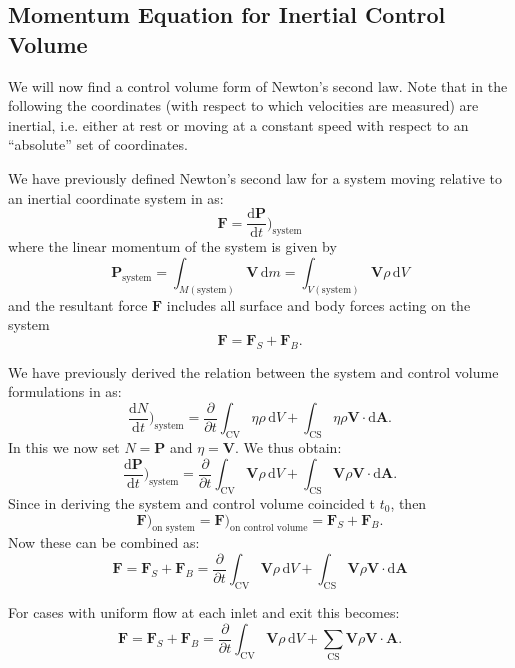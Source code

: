 
\subsection{Momentum Equation for Inertial Control Volume}
We will now find a control volume form of Newton's second law. Note that in the following the coordinates (with respect to which velocities are measured) are inertial, i.e. either at rest or moving at a constant speed with respect to an ``absolute'' set of coordinates.

We have previously defined Newton's second law for a system moving relative to an inertial coordinate system in  as:
\[ 
\textbf{F} = \frac{\mathrm{d}\textbf{P}}{\mathrm{d}t} \bigg)_{\mathrm{system}}
\]
where the linear momentum of the system is given by
\[ 
\textbf{P}_{\mathrm{system}} = \int_{M \left( \mathrm{system} \right)} \textbf{V} \, \mathrm{d}m = \int_{V (\mathrm{system})} \textbf{V} \rho \, \mathrm{d}V
\]
and the resultant force $\textbf{F}$ includes all surface and body forces acting on the system
\[ 
\textbf{F} = \textbf{F}_S + \textbf{F}_B
.\]

We have previously derived the relation between the system and control volume formulations in  as:
\[ 
\frac{\mathrm{d}N}{\mathrm{d}t} \bigg)_{\mathrm{system}} = \frac{\partial }{\partial t} \int_{\mathrm{CV}} \eta \rho \, \mathrm{d}V + \int_{\mathrm{CS}} \eta \rho \textbf{V} \cdot \mathrm{d}\textbf{A}
.\]
In this we now set $N = \textbf{P}$ and $\eta = \textbf{V}$. We thus obtain:
\[ 
\frac{\mathrm{d}\textbf{P}}{\mathrm{d}t} \bigg)_{\mathrm{system}} = \frac{\partial }{\partial t} \int_{\mathrm{CV}} \textbf{V} \rho \, \mathrm{d}V + \int_{\mathrm{CS}} \textbf{V} \rho \textbf{V} \cdot \mathrm{d} \textbf{A}
.\]
Since in deriving  the system and control volume coincided t $t_0$, then
\[ 
\textbf{F})_{\text{on system}} = \textbf{F})_{\text{on control volume}} = \textbf{F}_S + \textbf{F}_B
.\]
Now these can be combined as:
\begin{equation}\label{eq:convolN2}
  \textbf{F} = \textbf{F}_S + \textbf{F}_B = \frac{\partial}{\partial t} \int_{\mathrm{CV}} \textbf{V} \rho \, \mathrm{d}V + \int_{\mathrm{CS}} \textbf{V}\rho \textbf{V} \cdot \mathrm{d}\textbf{A} 
\end{equation}

For cases with uniform flow at each inlet and exit this becomes:
\[ 
\textbf{F} = \textbf{F}_S + \textbf{F}_B = \frac{\partial }{\partial t} \int_{\mathrm{CV}} \textbf{V} \rho \, \mathrm{d}V + \sum_{\mathrm{CS}} \textbf{V} \rho \textbf{V} \cdot \textbf{A}
.\]

